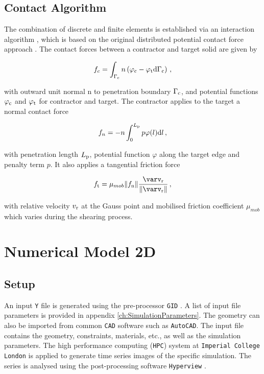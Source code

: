 \documentclass[12pt,twoside]{article}
\theoremstyle{break}
\begin{document}
\subsection{Contact Algorithm}

The combination of discrete and finite elements is established via an interaction algorithm \cite{Lei16}, which is based on the original distributed potential contact force approach \cite{Mun13}. The contact forces between a contractor and target solid are given by

\begin{equation}
    f_c=\int_{\Gamma_{\rm{c}}}n\left(\varphi_{\rm{c}}-\varphi_{\rm{t}}\rm{d}\Gamma_{\rm{c}}\right)\,,
\end{equation}

with outward unit normal n to penetration boundary $\Gamma_{\rm{c}}$, and potential functions $\varphi_{\rm{c}}$ and $\varphi_{\rm{t}}$ for contractor and target. The contractor applies to the target a normal contact force

\begin{equation}
    f_n=-n\int_0^{L_{\rm{p}}} p\varphi(l){\rm{d}}l\,,
\end{equation}

with penetration length $L_{\rm{p}}$, potential function $\varphi$ along the target edge and penalty term $p$. It also applies a tangential friction force 

\begin{equation}
    f_{\rm{t}}=\mu_{mob}\lVert f_{\rm{n}} \rVert\frac{\varv_{\rm{r}}}{\lVert \varv_{\rm{r}}\rVert}\,,
\end{equation}

with relative velocity $v_{\rm{r}}$ at the Gauss point and mobilised friction coefficient $\mu_{mob}$ which varies during the shearing process.

\section{Numerical Model 2D}

\subsection{Setup}

An input \texttt{Y} file is generated using the pre-processor \texttt{GID} \cite{GID11}. A list of input file parameters is provided in appendix \ref{ch:SimulationParameters}. The geometry can also be imported from common \texttt{CAD} software such as \texttt{AutoCAD}. The input file contains the geometry, constraints, materials, etc., as well as the simulation parameters. The high performance computing (\texttt{HPC}) system at \texttt{Imperial College London} is applied to generate time series images of the specific simulation. The series is analysed using the post-processing software \texttt{Hyperview} \cite{Hyp17}.
\end{document}
